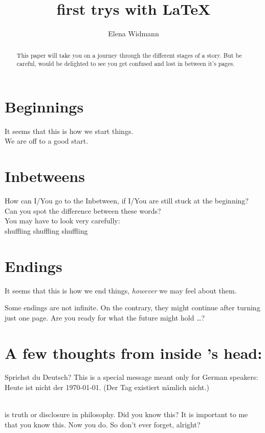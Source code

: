 \documentclass{article}
\author{Elena Widmann}
\title{first trys with \LaTeX}
\begin{document}
\maketitle
\tableofcontents
\setlength{\parindent}{0pt}\newpage

\begin{abstract}
This paper will take you on a journey through the different stages of a story. But be careful, \TheWriter{} would be delighted to see you get confused and lost in between it's pages.
\end{abstract}


\newpage
\section{Beginnings}
It seems that this is how we start things.\\
We are off to a good start.
\section{Inbetweens}
How can I\slash You go to the Inbetween, if I\slash You are still stuck at the beginning?\\
Can you spot the difference between these words? \\You may have to look very carefully:\\
shuffling shuf\mbox{}fling shuf\mbox{}f\mbox{}ling
\section{Endings}
It seems that this is how we end things, \emph{however} we may feel about them.

\newpage 
Some endings are not infinite. On the contrary, they might continue after turning just one page. Are you ready for what the future might hold \ldots ?
\newpage\section*{A few thoughts from inside \TheWriter's head:}

\begin{german}
Sprichst du Deutsch?
\textenglish{This is a special message meant only for German speakers:}
Heute ist nicht der \today. (Der Tag existiert nämlich nicht.)
\end{german}\\[1cm]

 is truth or disclosure in philosophy. Did you know this? It is important to me that you know this. Now you do. So don't ever forget, alright?\\[1cm]
\end{document}
